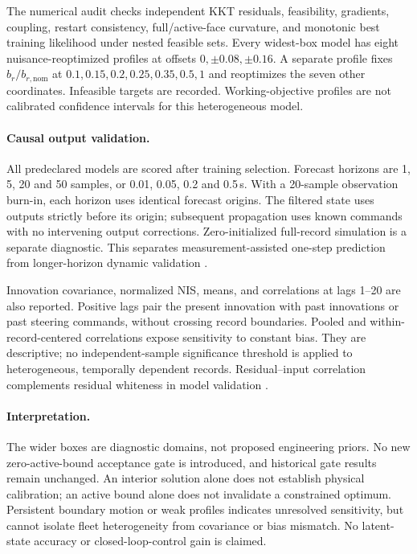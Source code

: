 The numerical audit checks independent KKT residuals, feasibility, gradients,
coupling, restart consistency, full/active-face curvature, and monotonic best
training likelihood under nested feasible sets. Every widest-box model has
eight nuisance-reoptimized profiles at offsets $0,\pm0.08,\pm0.16$. A separate
profile fixes $b_r/b_{r,\mathrm{nom}}$ at
$0.1,0.15,0.2,0.25,0.35,0.5,1$ and reoptimizes the seven other coordinates.
Infeasible targets are recorded. Working-objective profiles are not calibrated
confidence intervals for this heterogeneous model.

\paragraph{Causal output validation.}
All predeclared models are scored after training selection. Forecast horizons
are 1, 5, 20 and 50 samples, or 0.01, 0.05, 0.2 and 0.5\,s. With a
20-sample observation burn-in, each horizon uses identical forecast origins.
The filtered state uses outputs strictly before its origin; subsequent
propagation uses known commands with no intervening output corrections.
Zero-initialized full-record simulation is a separate diagnostic. This
separates measurement-assisted one-step prediction from longer-horizon
dynamic validation \cite{mathworksPrediction2026}.

Innovation covariance, normalized NIS, means, and correlations at lags 1--20
are also reported. Positive lags pair the present innovation with past
innovations or past steering commands, without crossing record boundaries.
Pooled and within-record-centered correlations expose sensitivity to constant
bias. They are descriptive; no independent-sample significance threshold is
applied to heterogeneous, temporally dependent records. Residual--input
correlation complements residual whiteness in model validation
\cite{mathworksResidual2026}.

\paragraph{Interpretation.}
The wider boxes are diagnostic domains, not proposed engineering priors.
No new zero-active-bound acceptance gate is introduced, and historical gate
results remain unchanged. An interior solution alone does not establish
physical calibration; an active bound alone does not invalidate a constrained
optimum. Persistent boundary motion or weak profiles indicates unresolved
sensitivity, but cannot isolate fleet heterogeneity from covariance or bias
mismatch. No latent-state accuracy or closed-loop-control gain is claimed.

